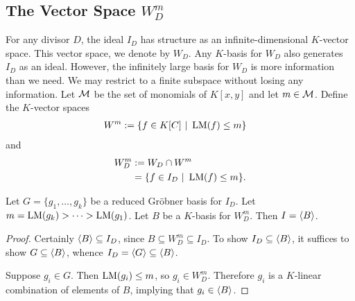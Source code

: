 
\subsection{The Vector Space $W_D^m$}


For any divisor $D$, the ideal $I_D$ has structure as an infinite-dimensional $K$-vector space.
This vector space, we denote by $W_D$.
Any $K$-basis for $W_D$ also generates $I_D$ as an ideal.
However, the infinitely large basis for $W_D$ is more information than we need.
We may restrict to a finite subspace without losing any information.
Let $\cal M$ be the set of monomials of $K[x,y]$ and let $m \in \cal M$.
Define the $K$-vector spaces
\begin{align*}
  W^m &:= \{ f \in K[C] ~|~ \LM(f) \leq m \}
\end{align*}
and
\begin{align*}
  W_D^m &:= W_D \cap W^m \\
        &= \{ f \in I_D ~|~ \LM(f) \leq m \}.
\end{align*}
\begin{comment}
\begin{remark}
  Since $-\nu_{P_\infty}(x^4) = -\nu_{P_\infty}(y^3)$, $W^{x^4} = W^{y^3}$.
  In practice, it is easier to assume $m$ is not divisible by $y^3$ and think of $W^m$ as the space
  \[ W^m = \{ f \in K[x,y] ~|~ \LM(f) \leq m, ~\text{$f$ is reduced modulo $y^3$} \}. \]
\end{remark}
\end{comment}
\begin{proposition}
  \label{prop_vector_space_basis_generates_I}
  Let $G = \{g_1, \ldots, g_k\}$ be a reduced Gr\"obner basis for $I_D$.
  Let $m = \LM(g_k) > \dots > \LM(g_1)$.
  Let $B$ be a $K$-basis for $W_D^m$.
  Then $I = \pid B$.
\end{proposition}
\begin{proof}
  Certainly $\pid B \subseteq I_D$, since $B \subseteq W_D^m \subseteq I_D$.
  To show $I_D \subseteq \pid B$, it suffices to show $G \subseteq \pid B$, whence $I_D = \pid G \subseteq \pid B$.
  
  Suppose $g_i \in G$.
  Then $\LM(g_i) \leq m$, so $g_i \in W_D^m$.
  Therefore $g_i$ is a $K$-linear combination of elements of $B$,
  implying that $g_i \in \pid B$.
\end{proof}

